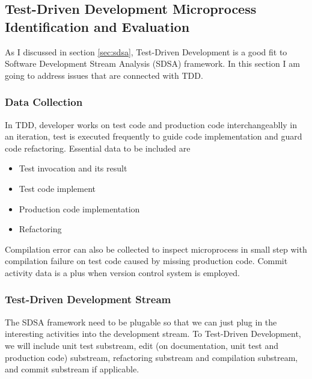 \subsection{Test-Driven Development Microprocess Identification and Evaluation}
As I discussed in section \ref{sec:sdsa}, Test-Driven Development is a good
fit to Software Development Stream Analysis (SDSA) framework. In this
section I am going to address issues that are connected with TDD.

\subsubsection{Data Collection}
In TDD, developer works on test code and production code interchangeablly
in an iteration, test is executed frequently to guide code implementation
and guard code refactoring.  Essential data to be included are
\begin{itemize}
\item {Test invocation and its result}
\item {Test code implement}
\item {Production code implementation}
\item {Refactoring}
\end{itemize}
Compilation error can also be collected to inspect microprocess in small step
with compilation failure on test code caused by missing production code.
Commit activity data is a plus when version control system is employed.

\subsubsection{Test-Driven Development Stream}
The SDSA framework need to be plugable so that we can just plug in the
interesting activities into the development stream. To Test-Driven
Development, we will include unit test substream, edit (on documentation,
unit test and production code) substream, refactoring substream and
compilation substream, and commit substream if applicable.

